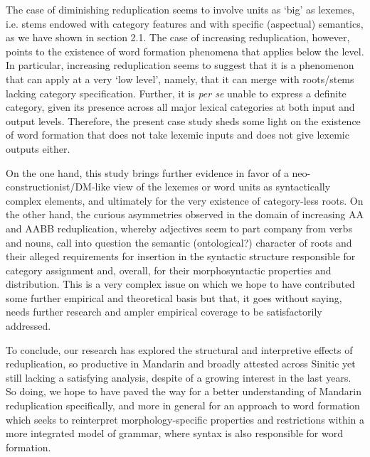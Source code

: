 \documentclass[output=paper]{langsci/langscibook}
\begin{document}
The case of diminishing reduplication seems to involve units as `big' as
lexemes, i.e. stems endowed with category features and with specific
(aspectual) semantics, as we have shown in section 2.1. The case of
increasing reduplication, however, points to the existence of word
formation phenomena that applies below the  level. In particular,
increasing reduplication seems to suggest that it is a phenomenon that
can apply at a very `low level', namely, that it can merge with
roots/stems lacking category specification. Further, it is \emph{per se}
unable to express a definite category, given its presence across all
major lexical categories at both input and output levels. Therefore, the
present case study sheds some light on the existence of word formation
that does not take lexemic inputs and does not give lexemic outputs
either.

On the one hand, this study brings further evidence in favor of a
neo-construc\-tionist\slash DM-like view of the lexemes or word units as
syntactically complex elements, and ultimately for the very existence of
category-less roots. On the other hand, the curious asymmetries observed
in the domain of increasing AA and AABB reduplication, whereby
adjectives seem to part company from verbs and nouns, call into 
question the semantic (ontological?) character of roots and their
alleged requirements for insertion in the syntactic structure
responsible for category assignment and, overall, for their
morphosyntactic properties and distribution. This is a very complex
issue on which we hope to have contributed some further empirical and
theoretical basis but that, it goes without saying, needs further
research and ampler empirical coverage to be satisfactorily addressed.

To conclude, our research has explored the structural and interpretive
effects of reduplication, so productive in Mandarin %
\citep[see][]{BascianoMelloni2017} %
%
and broadly attested across Sinitic %
\citep[see][]{ArcodiaBascianoEtAl2015} %
%
yet still lacking a satisfying analysis, despite of a
growing interest in the last years. So doing, we hope to have paved the
way for a better understanding of Mandarin reduplication specifically,
and more in general for an approach to word formation which seeks to
reinterpret morphology-specific properties and restrictions within a
more integrated model of grammar, where syntax is also responsible for
word formation.
\end{document}
